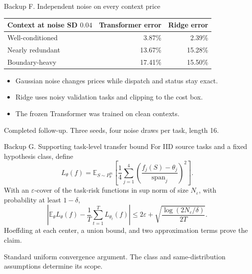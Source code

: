 \documentclass[aspectratio=169,11pt]{beamer}
\newcommand{\source}[1]{\par\vfill{\color{muted}\tiny #1}}
\begin{document}
\begin{frame}[noframenumbering]{Backup F. Independent noise on every context price}
\begin{center}
\begin{tabular}{lrr}
\toprule
Context at noise SD \(0.04\)&Transformer error&Ridge error\\
\midrule
Well-conditioned&3.87\%&2.39\%\\
Nearly redundant&13.67\%&15.28\%\\
Boundary-heavy&17.41\%&15.50\%\\
\bottomrule
\end{tabular}
\end{center}
\vspace{5mm}
\begin{itemize}
\item Gaussian noise changes prices while dispatch and status stay exact.
\item Ridge uses noisy validation tasks and clipping to the cost box.
\item The frozen Transformer was trained on clean contexts.
\end{itemize}
\source{Completed follow-up. Three seeds, four noise draws per task, length 16.}
\end{frame}

\begin{frame}[noframenumbering]{Backup G. Supporting task-level transfer bound}
\small
For IID source tasks and a fixed hypothesis class, define
\[
L_\theta(f)=\mathbb E_{S\sim P_\theta^m}
  \left[\frac14\sum_{j=1}^{4}
    \left(\frac{f_j(S)-\theta_j}{\mathrm{span}_j}\right)^2\right].
\]
With an \(\varepsilon\)-cover of the task-risk functions in sup norm of
size \(N_\varepsilon\), with probability at least \(1-\delta\),
\[
\left|\mathbb E_\theta L_\theta(f)-\frac1T\sum_{t=1}^{T}L_{\theta_t}(f)\right|
\le2\varepsilon+
\sqrt{\frac{\log(2N_\varepsilon/\delta)}{2T}}.
\]
Hoeffding at each center, a union bound, and two approximation terms prove the claim.
\source{Standard uniform convergence argument. The class and same-distribution assumptions determine its scope.}
\end{frame}
\end{document}
